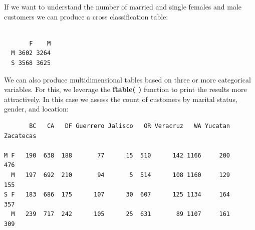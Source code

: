 \documentclass[
  letterpaper,
  DIV=11,
  numbers=noendperiod]{scrreprt}
\newenvironment{Shaded}{\begin{snugshade}}{\end{snugshade}}
\newcommand{\AttributeTok}[1]{\textcolor[rgb]{0.40,0.45,0.13}{#1}}
\newcommand{\CommentTok}[1]{\textcolor[rgb]{0.37,0.37,0.37}{#1}}
\newcommand{\FunctionTok}[1]{\textcolor[rgb]{0.28,0.35,0.67}{#1}}
\newcommand{\NormalTok}[1]{\textcolor[rgb]{0.00,0.23,0.31}{#1}}
\newcommand{\OtherTok}[1]{\textcolor[rgb]{0.00,0.23,0.31}{#1}}
\newcommand{\SpecialCharTok}[1]{\textcolor[rgb]{0.37,0.37,0.37}{#1}}
\newcommand{\StringTok}[1]{\textcolor[rgb]{0.13,0.47,0.30}{#1}}
\begin{document}
If we want to understand the number of married and single females and
male customers we can produce a cross classification table:

\begin{Shaded}
\end{Shaded}

\begin{verbatim}
   
       F    M
  M 3602 3264
  S 3568 3625
\end{verbatim}

We can also produce multidimensional tables based on three or more
categorical variables. For this, we leverage the \textbf{ftable( )}
function to print the results more attractively. In this case we assess
the count of customers by marital status, gender, and location:

\begin{Shaded}
\end{Shaded}

\begin{verbatim}
       BC   CA   DF Guerrero Jalisco   OR Veracruz   WA Yucatan Zacatecas
                                                                         
M F   190  638  188       77      15  510      142 1166     200       476
  M   197  692  210       94       5  514      108 1160     129       155
S F   183  686  175      107      30  607      125 1134     164       357
  M   239  717  242      105      25  631       89 1107     161       309
\end{verbatim}
\end{document}
